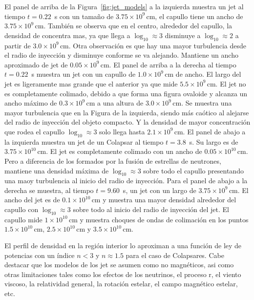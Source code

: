\documentclass[12pt,a4paper]{book}
\begin{document}
{\color{blue} El panel de arriba de la Figura~\ref{fig:jet_models} a la izquierda muestra un jet al tiempo $t = 0.22$~s con un tamaño de $3.75 \times 10^9 \, \text{cm}$, el capullo tiene un ancho de $3.75 \times 10^9 \, \text{cm}$. También se observa que en el centro, alrededor del capullo, la densidad de concentra mas, ya que llega a $\log_{10} \approx 3$ disminuye a $\log_{10} \approx 2$ a partir de $3.0 \times 10^9 \, \text{cm}$. 
Otra observación es que hay una mayor turbulencia desde el radio de inyección y disminuye conforme se va alejando. Mantiene un ancho aproximado de jet de $0.05 \times 10^9 \, \text{cm}$. 
El panel de arriba a la derecha al tiempo $t = 0.22$~s muestra un jet con un capullo de $1.0 \times 10^9 \, \text{cm}$ de ancho. El largo del jet es ligeramente mas grande que el anterior ya que 
mide $5.5 \times 10^9 \, \text{cm}$. El jet no es completamente colimado, debido a que forma una figura ovaloide y alcanza un ancho máximo de $0.3 \times 10^9 \, \text{cm}$ a una altura de $3.0 \times 10^9 \, \text{cm}$. 
Se muestra una mayor turbulencia que en la Figura de la izquierda, siendo más caótico al alejarse del radio de inyección del objeto compacto. Y la densidad de mayor concentración que 
rodea el capullo $\log_{10} \approx 3$ solo llega hasta $2.1 \times 10^9 \, \text{cm}$.
El panel de abajo a la izquierda muestra un jet de un Colapsar al tiempo $t = 3.8$~s. Su largo es de $3.75 \times 10^{10} \, \text{cm}$. El jet es completamente colimado con un ancho de $0.05 \times 10^{10} \, \text{cm}$. 
Pero a diferencia de los formados por la fusión de estrellas de neutrones, mantiene una densidad máxima de $\log_{10} \approx 3$ sobre todo el capullo presentando una maoy turbulencia al inicio del radio de
inyección.
Para el panel de abajo a la derecha se muestra, al tiempo $t = 9.60$~s, un jet con un largo de $3.75 \times 10^9 \, \text{cm}$. El ancho del jet es de $0.1 \times 10^{10} \, \text{cm}$ y muestra una mayor densidad alrededor
del capullo con $\log_{10} \approx 3$ sobre todo al inicio del radio de inyección del jet. El capullo mide $1 \times 10^{10} \, \text{cm}$ y muestra choques de ondas de colimación en los puntos
$1.5 \times 10^{10} \, \text{cm}$, $2.5 \times 10^{10} \, \text{cm}$ y $3.5 \times 10^{10} \, \text{cm}$.}

El perfil de densidad en la región interior lo aproximan a una función de ley de potencias con un índice $n<3$ y $n \approx 1.5$ para el caso de Colapsares. Cabe destacar 
que los modelos de los jet se asumen como no magnéticos, asi como otras limitaciones tales como los efectos de los neutrinos, el proceso r, el viento viscoso, la relatividad general, 
la rotación estelar, el campo magnético estelar, etc.
\end{document}
